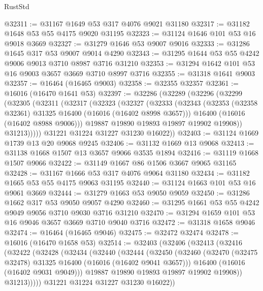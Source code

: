 \begin{lexlean}{RustStd}
\begin{coremodule}
@32311 := @31167 @1649 @53 @317 @4076 @9021 @31180
@32317 := @31182 @1648 @53 @55 @4175 @9020 @31195
@32323 := @31124 @1646 @101 @53 @16 @9018 @3669
@32327 := @31279 @1646 @53 @9007 @9016
@32333 := @31286 @1645 @317 @53 @9007 @9014 @4290
@32343 := @31295 @1644 @53 @55 @4242 @9006 @9013 @3710 @8987 @3716 @31210
@32353 := @31294 @1642 @101 @53 @16 @9003 @3657 @3669 @3710 @8997 @3716
@32355 := @31318 @1641 @9003
@32357 := @16464 (@16465 @9003)
@32358 := @32355 @32357
@32361 := @16016 (@16470 @1641 @53)
@32397 := @32286
    (@32289
      (@32296
        (@32299
          (@32305
            (@32311
              (@32317
                (@32323
                  (@32327
                    (@32333
                      (@32343
                        (@32353 (@32358 @32361) @31325 @16400 (@16016 (@16402 @8998 @3657)))
                        @16400
                        (@16016 (@16402 @8988 @9006)))
                      @19887
                      @19890
                      @19893
                      @19897
                      @19902
                      @19908))
                  @31213)))))
        @31221
        @31224
        @31227
        @31230
        @16022))
@32403 := @31124 @1669 @1739 @13 @20 @9068 @9245
@32406 := @31132 @1669 @13 @9068
@32413 := @31138 @1668 @1507 @13 @3657 @9066 @3535 @1894
@32416 := @31119 @1668 @1507 @9066
@32422 := @31149 @1667 @86 @1506 @3667 @9065 @31165
@32428 := @31167 @1666 @53 @317 @4076 @9064 @31180
@32434 := @31182 @1665 @53 @55 @4175 @9063 @31195
@32440 := @31124 @1663 @101 @53 @16 @9061 @3669
@32444 := @31279 @1663 @53 @9050 @9059
@32450 := @31286 @1662 @317 @53 @9050 @9057 @4290
@32460 := @31295 @1661 @53 @55 @4242 @9049 @9056 @3710 @9030 @3716 @31210
@32470 := @31294 @1659 @101 @53 @16 @9046 @3657 @3669 @3710 @9040 @3716
@32472 := @31318 @1658 @9046
@32474 := @16464 (@16465 @9046)
@32475 := @32472 @32474
@32478 := @16016 (@16470 @1658 @53)
@32514 := @32403
    (@32406
      (@32413
        (@32416
          (@32422
            (@32428
              (@32434
                (@32440
                  (@32444
                    (@32450
                      (@32460
                        (@32470 (@32475 @32478) @31325 @16400 (@16016 (@16402 @9041 @3657)))
                        @16400
                        (@16016 (@16402 @9031 @9049)))
                      @19887
                      @19890
                      @19893
                      @19897
                      @19902
                      @19908))
                  @31213)))))
        @31221
        @31224
        @31227
        @31230
        @16022))

\end{coremodule}
\end{lexlean}

